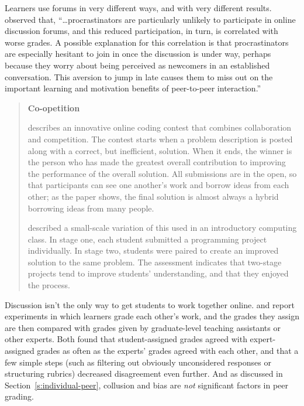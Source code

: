 Learners use forums in very different ways, and with very different
results. \cite{Mill2016a} observed that, ``\ldots{}procrastinators are
particularly unlikely to participate in online discussion forums, and
this reduced participation, in turn, is correlated with worse
grades. A possible explanation for this correlation is that
procrastinators are especially hesitant to join in once the discussion
is under way, perhaps because they worry about being perceived as
newcomers in an established conversation. This aversion to jump in
late causes them to miss out on the important learning and motivation
benefits of peer-to-peer interaction.''

\begin{quote}\setlength{\parindent}{0pt}
\textbf{Co-opetition}

\cite{Gull2004} describes an innovative online coding contest that
combines collaboration and competition. The contest starts when a
problem description is posted along with a correct, but inefficient,
solution. When it ends, the winner is the person who has made the
greatest overall contribution to improving the performance of the
overall solution. All submissions are in the open, so that
participants can see one another's work and borrow ideas from each
other; as the paper shows, the final solution is almost always a
hybrid borrowing ideas from many people.

\cite{Batt2018} described a small-scale variation of this used in
an introductory computing class. In stage one, each student submitted
a programming project individually. In stage two, students were paired
to create an improved solution to the same problem. The assessment
indicates that two-stage projects tend to improve students'
understanding, and that they enjoyed the process.
\end{quote}

Discussion isn't the only way to get students to work together online.
\cite{Pare2008} and \cite{Kulk2013} report experiments in which
learners grade each other's work, and the grades they assign are then
compared with grades given by graduate-level teaching assistants or
other experts. Both found that student-assigned grades agreed with
expert-assigned grades as often as the experts' grades agreed with each
other, and that a few simple steps (such as filtering out obviously
unconsidered responses or structuring rubrics) decreased disagreement
even further. And as discussed in Section~\ref{s:individual-peer},
collusion and bias are \emph{not} significant factors in peer grading.

